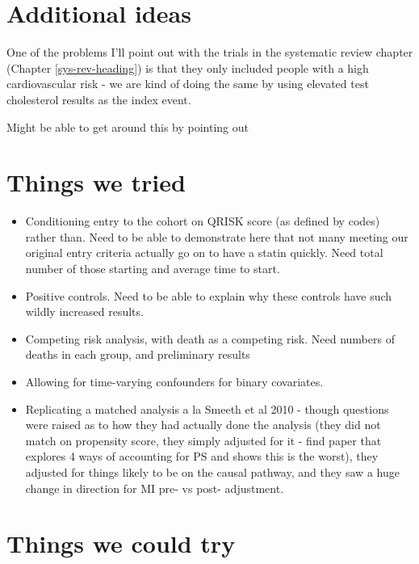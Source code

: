 \documentclass[a4paper, twoside]{templates/ociamthesis}
\providecommand{\tightlist}{%
  \setlength{\itemsep}{0pt}\setlength{\parskip}{0pt}}
\begin{document}
\minitoc 

\hypertarget{additional-ideas-2}{%
\section{Additional ideas}\label{additional-ideas-2}}

One of the problems I'll point out with the trials in the systematic review chapter (Chapter \ref{sys-rev-heading}) is that they only included people with a high cardiovascular risk - we are kind of doing the same by using elevated test cholesterol results as the index event.

Might be able to get around this by pointing out

\hypertarget{things-we-tried}{%
\section{Things we tried}\label{things-we-tried}}

\begin{itemize}
\tightlist
\item
  Conditioning entry to the cohort on QRISK score (as defined by codes) rather than. Need to be able to demonstrate here that not many meeting our original entry criteria actually go on to have a statin quickly. Need total number of those starting and average time to start.
\item
  Positive controls. Need to be able to explain why these controls have such wildly increased results.
\item
  Competing risk analysis, with death as a competing risk. Need numbers of deaths in each group, and preliminary results
\item
  Allowing for time-varying confounders for binary covariates.
\item
  Replicating a matched analysis a la Smeeth et al 2010 - though questions were raised as to how they had actually done the analysis (they did not match on propensity score, they simply adjusted for it - find paper that explores 4 ways of accounting for PS and shows this is the worst), they adjusted for things likely to be on the causal pathway, and they saw a huge change in direction for MI pre- vs post- adjustment.
\end{itemize}

\hypertarget{things-we-could-try}{%
\section{Things we could try}\label{things-we-could-try}}
\end{document}
